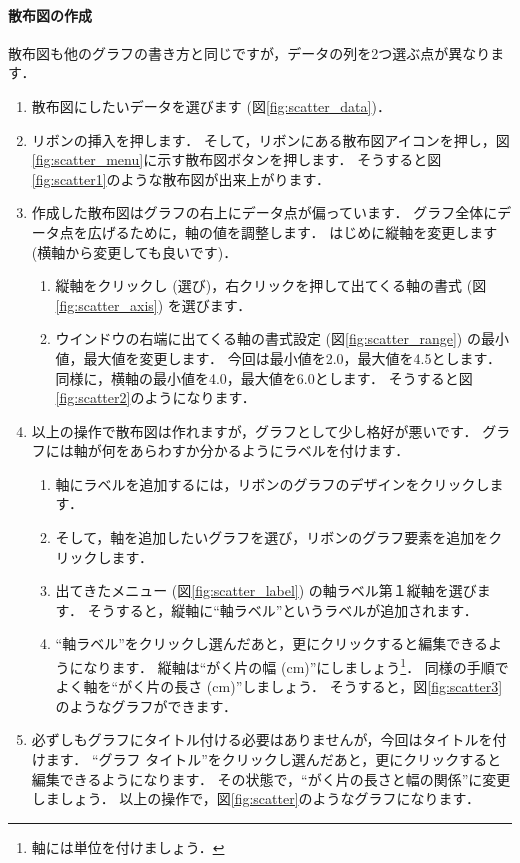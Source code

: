 \paragraph{散布図の作成}

散布図も他のグラフの書き方と同じですが，データの列を2つ選ぶ点が異なります．

\begin{enumerate}
    \item 散布図にしたいデータを選びます (図\ref{fig:scatter_data})．
    \item リボンの挿入を押します．
    そして，リボンにある散布図アイコンを押し，図\ref{fig:scatter_menu}に示す散布図ボタンを押します．
    そうすると図\ref{fig:scatter1}のような散布図が出来上がります．
    \item 作成した散布図はグラフの右上にデータ点が偏っています．
    グラフ全体にデータ点を広げるために，軸の値を調整します．
    はじめに縦軸を変更します (横軸から変更しても良いです)．
    \begin{enumerate}
        \item 縦軸をクリックし (選び)，右クリックを押して出てくる軸の書式 (図\ref{fig:scatter_axis}) を選びます．
        \item ウインドウの右端に出てくる軸の書式設定 (図\ref{fig:scatter_range}) の最小値，最大値を変更します．
        今回は最小値を2.0，最大値を4.5とします．
        同様に，横軸の最小値を4.0，最大値を6.0とします．
        そうすると図\ref{fig:scatter2}のようになります．
    \end{enumerate}
    \item 以上の操作で散布図は作れますが，グラフとして少し格好が悪いです．
    グラフには軸が何をあらわすか分かるようにラベルを付けます．
    \begin{enumerate}
        \item 軸にラベルを追加するには，リボンのグラフのデザインをクリックします．
        \item そして，軸を追加したいグラフを選び，リボンのグラフ要素を追加をクリックします．
        \item 出てきたメニュー (図\ref{fig:scatter_label}) の軸ラベル第１縦軸を選びます．
        そうすると，縦軸に``軸ラベル''というラベルが追加されます．
        \item ``軸ラベル''をクリックし選んだあと，更にクリックすると編集できるようになります．
        縦軸は``がく片の幅 (cm)''にしましょう\footnote{軸には単位を付けましょう．}．
        同様の手順でよく軸を``がく片の長さ (cm)''しましょう．
        そうすると，図\ref{fig:scatter3}のようなグラフができます．
    \end{enumerate}
    \item 必ずしもグラフにタイトル付ける必要はありませんが，今回はタイトルを付けます．
    ``グラフ タイトル''をクリックし選んだあと，更にクリックすると編集できるようになります．
    その状態で，``がく片の長さと幅の関係''に変更しましょう．
    以上の操作で，図\ref{fig:scatter}のようなグラフになります．
\end{enumerate}


